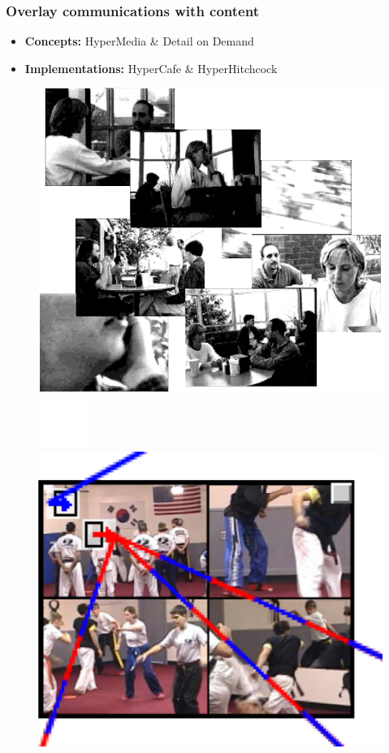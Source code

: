 \documentclass[compress]{beamer}
\begin{document}
  		\begin{frame}[c]
		\frametitle{Overlay communications with content}
		\begin{itemize}
		\item \textbf{Concepts:} HyperMedia \& Detail on Demand
		\vfill
		\item \textbf{Implementations:} HyperCafe \& HyperHitchcock  %
				
		\end{itemize}
		
		\begin{figure}
			\includegraphics[height=0.4\textheight]{figures/hypercafe.png}
			\includegraphics[height=0.1\textheight]{figures/space.png}
			\includegraphics[height=0.4\textheight]{figures/hitchcock.png}
		\end{figure}
		\end{frame}
\end{document}
